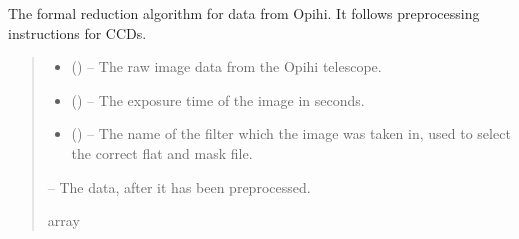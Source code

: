 \documentclass[letterpaper,11pt,english]{sphinxmanual}
\begin{document}
\begin{savenotes}
\begin{fulllineitems}
\begin{savenotes}\begin{fulllineitems}
\label{\detokenize{code/opihiexarata.opihi.preprocess:opihiexarata.opihi.preprocess.OpihiPreprocessSolution.preprocess_data_image}}
\pysigstartsignatures
{}
\pysigstopsignatures
\sphinxAtStartPar
The formal reduction algorithm for data from Opihi. It follows
preprocessing instructions for CCDs.
\begin{quote}\begin{description}
\begin{itemize}
\item {} 
\sphinxAtStartPar
{} () – The raw image data from the Opihi telescope.

\item {} 
\sphinxAtStartPar
{} () – The exposure time of the image in seconds.

\item {} 
\sphinxAtStartPar
{} () – The name of the filter which the image was taken in, used to
select the correct flat and mask file.

\end{itemize}

\sphinxAtStartPar
{} – The data, after it has been preprocessed.

\sphinxAtStartPar
array

\end{description}\end{quote}

\end{fulllineitems}\end{savenotes}



\end{fulllineitems}
\end{savenotes}
\end{document}
